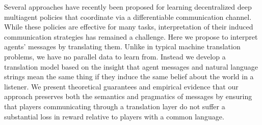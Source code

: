 Several approaches have recently been proposed for learning decentralized deep multiagent policies that coordinate via a differentiable communication channel. While these policies are effective for many tasks, interpretation of their induced communication strategies has remained a challenge. Here we propose to interpret agents' messages by translating them.  Unlike in typical machine translation problems, we have no parallel data to learn from. Instead we develop a translation model based on the insight that agent messages and natural language strings mean the same thing if they induce the same belief about the world in a listener.  We present theoretical guarantees and empirical evidence that our approach preserves both the semantics and pragmatics of messages by ensuring that players communicating through a translation layer do not suffer a substantial loss in reward relative to players with a common language.
